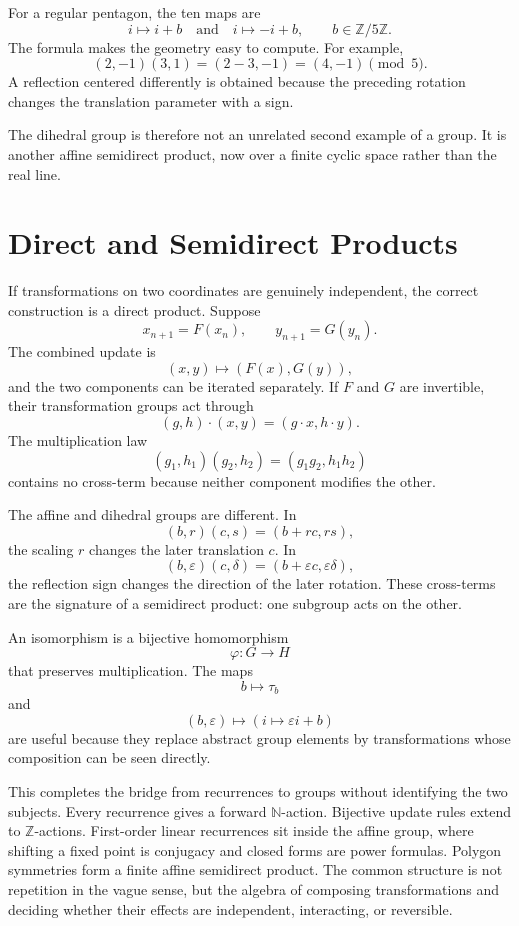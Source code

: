 For a regular pentagon, the ten maps are
\[
  i\mapsto i+b
  \quad\text{and}\quad
  i\mapsto -i+b,
  \qquad b\in\mathbb Z/5\mathbb Z.
\]
The formula makes the geometry easy to compute.  For example,
\[
  (2,-1)(3,1)
  =(2-3,-1)
  =(4,-1)
  \pmod5.
\]
A reflection centered differently is obtained because the preceding rotation changes the translation parameter with a sign.

The dihedral group is therefore not an unrelated second example of a group.  It is another affine semidirect product, now over a finite cyclic space rather than the real line.

\section{Direct and Semidirect Products}

If transformations on two coordinates are genuinely independent, the correct construction is a direct product.  Suppose
\[
  x_{n+1}=F(x_n),
  \qquad
  y_{n+1}=G(y_n).
\]
The combined update is
\[
  (x,y)\longmapsto(F(x),G(y)),
\]
and the two components can be iterated separately.  If \(F\) and \(G\) are invertible, their transformation groups act through
\[
  (g,h)\cdot(x,y)=(g\cdot x,h\cdot y).
\]
The multiplication law
\[
  (g_1,h_1)(g_2,h_2)
  =(g_1g_2,h_1h_2)
\]
contains no cross-term because neither component modifies the other.

The affine and dihedral groups are different.  In
\[
  (b,r)(c,s)=(b+rc,rs),
\]
the scaling \(r\) changes the later translation \(c\).  In
\[
  (b,\varepsilon)(c,\delta)
  =(b+\varepsilon c,\varepsilon\delta),
\]
the reflection sign changes the direction of the later rotation.  These cross-terms are the signature of a semidirect product: one subgroup acts on the other.

An isomorphism is a bijective homomorphism
\[
  \varphi:G\to H
\]
that preserves multiplication.  The maps
\[
  b\longmapsto\tau_b
\]
and
\[
  (b,\varepsilon)\longmapsto(i\mapsto\varepsilon i+b)
\]
are useful because they replace abstract group elements by transformations whose composition can be seen directly.

This completes the bridge from recurrences to groups without identifying the two subjects.  Every recurrence gives a forward \(\mathbb N\)-action.  Bijective update rules extend to \(\mathbb Z\)-actions.  First-order linear recurrences sit inside the affine group, where shifting a fixed point is conjugacy and closed forms are power formulas.  Polygon symmetries form a finite affine semidirect product.  The common structure is not repetition in the vague sense, but the algebra of composing transformations and deciding whether their effects are independent, interacting, or reversible.
